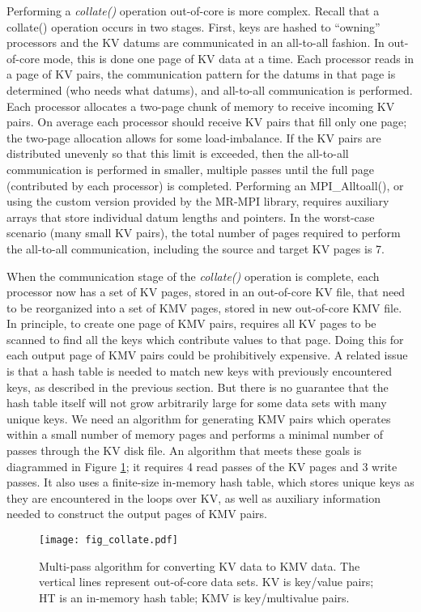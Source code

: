 Performing a {\it collate()} operation out-of-core is more complex.
Recall that a collate() operation occurs in two stages.  First, keys
are hashed to ``owning'' processors and the KV datums are communicated
in an all-to-all fashion.  In out-of-core mode, this is done one page
of KV data at a time.  Each processor reads in a page of KV pairs, the
communication pattern for the datums in that page is determined (who
needs what datums), and all-to-all communication is performed.  Each
processor allocates a two-page chunk of memory to receive incoming KV
pairs.  On average each processor should receive KV pairs that fill
only one page; the two-page allocation allows for some load-imbalance.
If the KV pairs are distributed unevenly so that this limit is
exceeded, then the all-to-all communication is performed in smaller,
multiple passes until the full page (contributed by each processor) is
completed.  Performing an MPI\_Alltoall(), or using the custom version
provided by the MR-MPI library, requires auxiliary arrays that store
individual datum lengths and pointers.  In the worst-case scenario
(many small KV pairs), the total number of pages required to perform
the all-to-all communication, including the source and target KV pages
is 7.

When the communication stage of the {\it collate()} operation is
complete, each processor now has a set of KV pages, stored in an
out-of-core KV file, that need to be reorganized into a set of KMV
pages, stored in new out-of-core KMV file.  In principle, to create
one page of KMV pairs, requires all KV pages to be scanned to find all
the keys which contribute values to that page.  Doing this for each
output page of KMV pairs could be prohibitively expensive.  A related
issue is that a hash table is needed to match new keys with previously
encountered keys, as described in the previous section.  But there is
no guarantee that the hash table itself will not grow arbitrarily
large for some data sets with many unique keys.  We need an algorithm
for generating KMV pairs which operates within a small number of
memory pages and performs a minimal number of passes through the KV
disk file.  An algorithm that meets these goals is diagrammed in
Figure \ref{f:collate}; it requires 4 read passes of the KV pages and
3 write passes.  It also uses a finite-size in-memory hash table,
which stores unique keys as they are encountered in the loops over KV,
as well as auxiliary information needed to construct the output pages
of KMV pairs.

\begin{figure}
\texttt{[image: fig\_collate.pdf]}
\caption{Multi-pass algorithm for converting KV data to KMV data.  The
vertical lines represent out-of-core data sets.  KV is key/value
pairs; HT is an in-memory hash table; KMV is key/multivalue pairs.}
\label{f:collate}
\end{figure}

